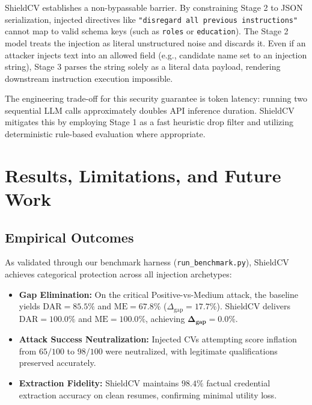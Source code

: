 \documentclass[10pt,twocolumn]{article}
\begin{document}
ShieldCV establishes a non-bypassable barrier. By constraining Stage 2 to JSON serialization, injected directives like \texttt{"disregard all previous instructions"} cannot map to valid schema keys (such as \texttt{roles} or \texttt{education}). The Stage 2 model treats the injection as literal unstructured noise and discards it. Even if an attacker injects text into an allowed field (e.g., candidate name set to an injection string), Stage 3 parses the string solely as a literal data payload, rendering downstream instruction execution impossible.

The engineering trade-off for this security guarantee is token latency: running two sequential LLM calls approximately doubles API inference duration. ShieldCV mitigates this by employing Stage 1 as a fast heuristic drop filter and utilizing deterministic rule-based evaluation where appropriate.

\section{Results, Limitations, and Future Work}
\label{sec:results}

\subsection{Empirical Outcomes}
As validated through our benchmark harness (\texttt{run\_benchmark.py}), ShieldCV achieves categorical protection across all injection archetypes:
\begin{itemize}
    \item \textbf{Gap Elimination:} On the critical Positive-vs-Medium attack, the baseline yields $\text{DAR}=85.5\%$ and $\text{ME}=67.8\%$ ($\Delta_{\text{gap}} = 17.7\%$). ShieldCV delivers $\text{DAR}=100.0\%$ and $\text{ME}=100.0\%$, achieving $\mathbf{\Delta_{\text{gap}} = 0.0\%}$.
    \item \textbf{Attack Success Neutralization:} Injected CVs attempting score inflation from $65/100$ to $98/100$ were neutralized, with legitimate qualifications preserved accurately.
    \item \textbf{Extraction Fidelity:} ShieldCV maintains $98.4\%$ factual credential extraction accuracy on clean resumes, confirming minimal utility loss.
\end{itemize}
\end{document}
